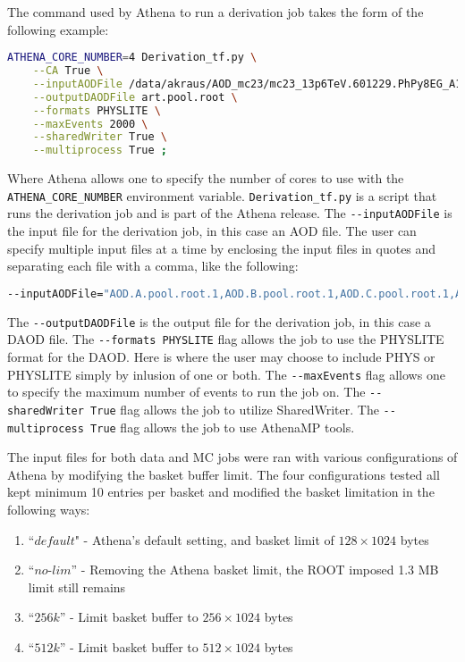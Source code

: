 The command used by Athena to run a derivation job takes the form of the following example: 
\begin{lstlisting}[language=bash]
    ATHENA_CORE_NUMBER=4 Derivation_tf.py \
    --CA True \
    --inputAODFile /data/akraus/AOD_mc23/mc23_13p6TeV.601229.PhPy8EG_A14_ttbar_hdamp258p75_SingleLep.merge.AOD.e8514_e8528_s4162_s4114_r14622_r14663/AOD.33799166._001224.pool.root.1 \
    --outputDAODFile art.pool.root \
    --formats PHYSLITE \
    --maxEvents 2000 \
    --sharedWriter True \
    --multiprocess True ;  
\end{lstlisting}
Where Athena allows one to specify the number of cores to use with the \verb|ATHENA_CORE_NUMBER| environment variable.
\verb|Derivation_tf.py| is a script that runs the derivation job and is part of the Athena release.
The \verb|--inputAODFile| is the input file for the derivation job, in this case an AOD file.
The user can specify multiple input files at a time by enclosing the input files in quotes and separating each file with a comma, like the following:
\begin{lstlisting}[language=bash]
    --inputAODFile="AOD.A.pool.root.1,AOD.B.pool.root.1,AOD.C.pool.root.1,AOD.D.pool.root.1"
\end{lstlisting}
The \verb|--outputDAODFile| is the output file for the derivation job, in this case a DAOD file.
The \verb|--formats PHYSLITE| flag allows the job to use the PHYSLITE format for the DAOD.
Here is where the user may choose to include PHYS or PHYSLITE simply by inlusion of one or both.
The \verb|--maxEvents| flag allows one to specify the maximum number of events to run the job on.
The \verb|--sharedWriter True| flag allows the job to utilize SharedWriter. 
The \verb|--multiprocess True| flag allows the job to use AthenaMP tools.




The input files for both data and MC jobs were ran with various configurations of Athena by modifying the basket buffer limit. 
The four configurations tested all kept minimum 10 entries per basket and modified the basket limitation in the following ways: 

\begin{enumerate}
    \item ``$\textit{default}$" - Athena's default setting, and basket limit of $128\times1024$ bytes
    \item ``$\textit{no-lim}$'' - Removing the Athena basket limit, the ROOT imposed 1.3 MB limit still remains
    \item ``$\textit{256k}$'' - Limit basket buffer to $256\times1024$ bytes
    \item ``$\textit{512k}$'' - Limit basket buffer to $512\times1024$ bytes
\end{enumerate}

